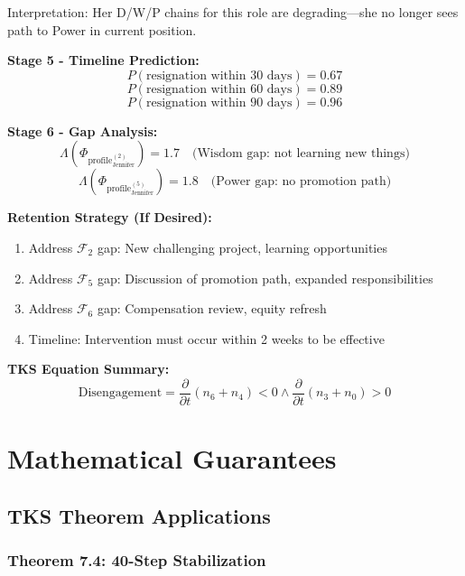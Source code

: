 \documentclass[11pt,twoside]{book}
\newcommand{\Foundations}{\mathcal{F}}
\newcommand{\Lacunarity}{\Lambda}
\newcommand{\ProfileFrac}{\Phi_{\mathrm{profile}}}
\begin{document}
\begin{tcolorbox}[colback=yellow!5!white,colframe=yellow!65!black,title=\textbf{Scenario: Predicting Jennifer's Resignation},breakable]
Interpretation: Her D/W/P chains for this role are degrading---she no longer sees path to Power in current position.

\textbf{Stage 5 - Timeline Prediction:}
\[
    P(\text{resignation within 30 days}) = 0.67
\]
\[
    P(\text{resignation within 60 days}) = 0.89
\]
\[
    P(\text{resignation within 90 days}) = 0.96
\]

\textbf{Stage 6 - Gap Analysis:}
\[
    \Lacunarity(\ProfileFrac_{\text{Jennifer}}^{(2)}) = 1.7 \quad \text{(Wisdom gap: not learning new things)}
\]
\[
    \Lacunarity(\ProfileFrac_{\text{Jennifer}}^{(5)}) = 1.8 \quad \text{(Power gap: no promotion path)}
\]

\textbf{Retention Strategy (If Desired):}
\begin{enumerate}
    \item Address $\Foundations_2$ gap: New challenging project, learning opportunities
    \item Address $\Foundations_5$ gap: Discussion of promotion path, expanded responsibilities
    \item Address $\Foundations_6$ gap: Compensation review, equity refresh
    \item Timeline: Intervention must occur within 2 weeks to be effective
\end{enumerate}

\textbf{TKS Equation Summary:}
\begin{equation}
\boxed{
    \text{Disengagement} = \frac{\partial}{\partial t}\left( n_6 + n_4 \right) < 0
    \land \frac{\partial}{\partial t}\left( n_3 + n_0 \right) > 0
}
\end{equation}

\end{tcolorbox}

\part{Mathematical Guarantees}

\chapter{TKS Theorem Applications}
\label{ch:theorems}

\section{Theorem 7.4: 40-Step Stabilization}
\end{document}

